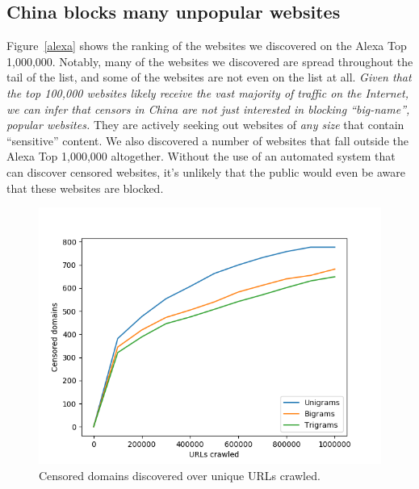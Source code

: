 \begin{table}[b]
  \begin{center}
  \end{center}
\caption{\label{breakdown} Total number of censored domains discovered.}
\end{table}

\subsection{China blocks many unpopular websites}
Figure~\ref{alexa} shows the ranking of the websites we discovered on
the Alexa Top 1,000,000. Notably, many of the websites we discovered
are spread throughout the tail of the list, and some of the websites
are not even on the list at all. \textit{Given that the top 100,000 websites
likely receive the vast majority of traffic on the Internet, we can
infer that censors in China are not just interested in blocking
``big-name'', popular websites.} They are actively seeking out websites
of \textit{any size} that contain ``sensitive'' content. We also
discovered a number of websites that fall outside the Alexa Top
1,000,000 altogether. Without the use of an automated system that can
discover censored websites, it's unlikely that the public would even
be aware that these websites are blocked.

\begin{figure}[t]
  \centering
  \includegraphics[scale=0.5]{figures/urls-crawled}
  \caption{\label{censored-vs-urls} Censored domains discovered over unique URLs crawled. }
\end{figure}

